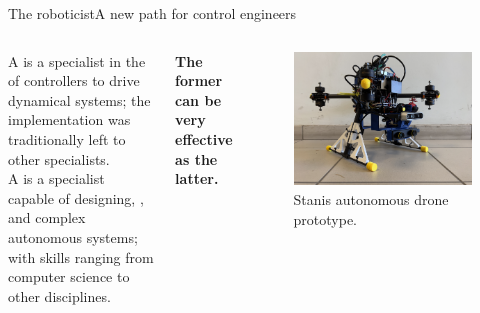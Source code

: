 \begin{frame}{The roboticist}{A new path for control engineers}
  \begin{columns}
    A  is a specialist in the  of controllers to drive dynamical systems; the implementation was traditionally left to other specialists.\\
    A  is a specialist capable of designing, , and  complex autonomous systems; with skills ranging from computer science to other disciplines.
    \begin{block}{}
      \centering
      \textbf{The former can be very effective as the latter.}
    \end{block}

    \begin{figure}
      \centering
      \includegraphics[width=.8\textwidth]{stanis}
      \caption{Stanis autonomous drone prototype.}
      \label{fig:stanis}
    \end{figure}
  \end{columns}
\end{frame}

